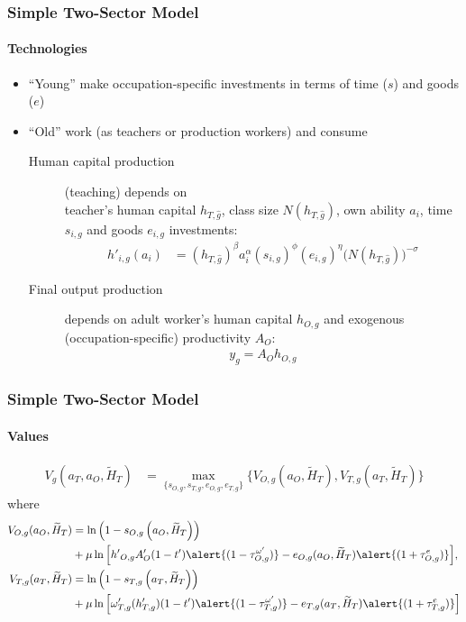 \documentclass[11pt,hyperref={bookmarks=false},table,aspectratio=169]{beamer}
\begin{document}
	\begin{frame}
		\frametitle{Simple Two-Sector Model}
		\framesubtitle{Technologies}
		\begin{itemize}
			\item ``Young'' make occupation-specific investments in terms of time ($s$) and goods ($e$)
			\item ``Old'' work (as \alert{teachers} or \alert{production workers}) and consume
			\begin{description}
				\item[Human capital production] (teaching) depends on\\
				teacher's human capital $h_{T,\hat{g}}$, class size $N(h_{T,\hat{g}})$,  own ability $a_i$, time $s_{i,g}$ and goods $e_{i,g}$ investments:
				\begin{align*}
					\label{}
					h'_{i,g}(a_i) & =\left( h_{T,\hat{g}}\right)^\beta a_i^\alpha(s_{i,g})^{\phi} (e_{i,g})^{\eta}\big(N(h_{T,\hat{g}})\big)^{-\sigma} %
				\end{align*}
				\item[Final output production] depends on adult worker's human capital $h_{O,g}$ and exogenous (occupation-specific) productivity $A_O$:
				\begin{align*}
					\label{}
					y_g = A_O h_{O,g}
				\end{align*}
			\end{description}
		\end{itemize}
	\end{frame}
	
	
	\begin{frame}
		\frametitle{Simple Two-Sector Model}
		\framesubtitle{Values}
		\begin{align*}
			\label{}
			V_g(a_T,a_O,\widetilde{H}_T) & = \max_{\{s_{O,g},s_{T,g},e_{O,g},e_{T,g}\}} \bigg\{ V_{O,g}(a_O,\widetilde{H}_T), V_{T,g}(a_T,\widetilde{H}_T) \bigg\} \label{eq:V}
		\end{align*}
		where
		\begin{align*}
			V_{O,g}(a_O,\widetilde{H}_T) & = \ln\left(1-s_{O,g}\left(a_O,\widetilde{H}_T\right)\right)\nonumber \\
			& + \mu \ln \Big[ {{h'}_{O,g}} A_O'(1-t')\alert{(1-\tau^{\omega '}_{O,g})}  - e_{O,g}(a_O,\widetilde{H}_T)\alert{(1+\tau^e_{O,g})} \Big],\\
			V_{T,g}(a_T,\widetilde{H}_T) & = \ln\left(1-s_{T,g}\left(a_T,\widetilde{H}_T\right)\right) \nonumber \\
			& + \mu \ln \Big[ \omega_{T,g}'({h_{T,g}'})(1-t')\alert{(1-\tau^{\omega '}_{T,g}) } - e_{T,g}(a_T,\widetilde{H}_T)\alert{(1+\tau^{e }_{T,g})} \Big] 
		\end{align*}
	\end{frame}
	
\end{document}
